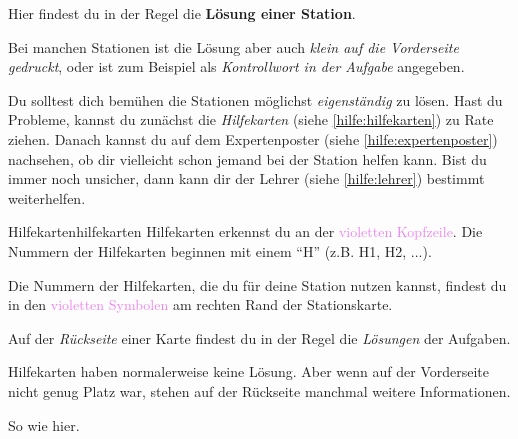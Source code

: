 \documentclass[12pt,a5paper,landscape]{scrartcl}
\begin{document}
\begin{loesungskarte}
\begin{center}
Hier findest du in der Regel die \textbf{Lösung einer Station}.
\end{center}

Bei manchen Stationen ist die Lösung aber auch \emph{klein auf die Vorderseite gedruckt}, oder ist zum Beispiel als \emph{Kontrollwort in der Aufgabe} angegeben.

\bigskip
Du solltest dich bemühen die Stationen möglichst \emph{eigenständig} zu lösen. Hast du Probleme, kannst du zunächst die \emph{Hilfekarten} (siehe \ref{hilfe:hilfekarten}) zu Rate ziehen. Danach kannst du auf dem Expertenposter (siehe \ref{hilfe:expertenposter}) nachsehen, ob dir vielleicht schon jemand bei der Station helfen kann. Bist du immer noch unsicher, dann kann dir der Lehrer (siehe \ref{hilfe:lehrer}) bestimmt weiterhelfen.
\end{loesungskarte}

\begin{hilfekarte}{Hilfekarten}{hilfekarten}
Hilfekarten erkennst du an der \textcolor{violet}{violetten Kopfzeile}. Die Nummern der Hilfekarten beginnen mit einem \enquote{H} (z.B. H1, H2, ...).

\begin{center}\end{center}

Die Nummern der Hilfekarten, die du für deine Station nutzen kannst, findest du in den \textcolor{violet}{violetten Symbolen} am rechten Rand der Stationskarte.

\begin{center}
\end{center}
\end{hilfekarte}


\begin{loesungskarte}[Rückseiten]
Auf der \emph{Rückseite} einer Karte findest du in der Regel die \emph{Lösungen} der Aufgaben.

\medskip
Hilfekarten haben normalerweise keine Lösung. Aber wenn auf der Vorderseite nicht genug Platz war, stehen auf der Rückseite manchmal weitere Informationen.

\medskip
So wie hier. \symSmileyZwinkernd
\end{loesungskarte}
\end{document}
